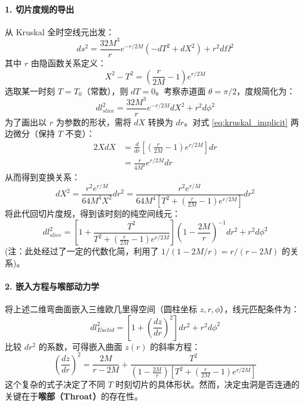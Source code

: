 \paragraph{1. 切片度规的导出}
从 Kruskal 全时空线元出发：
\begin{equation}
    ds^2 = \frac{32M^3}{r} e^{-r/2M} (-dT^2 + dX^2) + r^2 d\Omega^2
\end{equation}
其中 $r$ 由隐函数关系定义：
\begin{equation}
    X^2 - T^2 = \left(\frac{r}{2M} - 1\right) e^{r/2M} \label{eq:kruskal_implicit}
\end{equation}
选取某一时刻 $T = T_0$（常数），则 $dT=0$。考察赤道面 $\theta = \pi/2$，度规简化为：
\begin{equation}
    dl^2_{slice} = \frac{32M^3}{r} e^{-r/2M} dX^2 + r^2 d\phi^2
\end{equation}
为了画出以 $r$ 为参数的形状，需将 $dX$ 转换为 $dr$。对式 \eqref{eq:kruskal_implicit} 两边微分（保持 $T$ 不变）：
\begin{align}
    2X dX &= \frac{d}{dr}\left[ \left(\frac{r}{2M} - 1\right) e^{r/2M} \right] dr \\
    &= \frac{r}{4M^2} e^{r/2M} dr
\end{align}
从而得到变换关系：
\begin{equation}
    dX^2 = \frac{r^2 e^{r/M}}{64M^4 X^2} dr^2 = \frac{r^2 e^{r/M}}{64M^4 \left[ T^2 + (\frac{r}{2M}-1)e^{r/2M} \right]} dr^2
\end{equation}
将此代回切片度规，得到该时刻的纯空间线元：
\begin{equation}
    dl^2_{slice} = \left[ 1 + \frac{T^2}{T^2 + (\frac{r}{2M}-1)e^{r/2M}} \right] \left(1-\frac{2M}{r}\right)^{-1} dr^2 + r^2 d\phi^2
    \label{eq:dynamic_metric}
\end{equation}
(注：此处经过了一定的代数化简，利用了 $1/(1-2M/r) = r/(r-2M)$ 的关系)。

\paragraph{2. 嵌入方程与喉部动力学}
将上述二维弯曲面嵌入三维欧几里得空间（圆柱坐标 $z, r, \phi$），线元匹配条件为：
\begin{equation}
    dl^2_{Euclid} = \left[ 1 + \left(\frac{dz}{dr}\right)^2 \right] dr^2 + r^2 d\phi^2
\end{equation}
比较 $dr^2$ 的系数，可得嵌入曲面 $z(r)$ 的斜率方程：
\begin{equation}
    \left(\frac{dz}{dr}\right)^2 = \frac{2M}{r-2M} + \frac{T^2}{(1-\frac{2M}{r})\left[ T^2 + (\frac{r}{2M}-1)e^{r/2M} \right]}
\end{equation}
这个复杂的式子决定了不同 $T$ 时刻切片的具体形状。然而，决定虫洞是否连通的关键在于\textbf{喉部（Throat）}的存在性。

